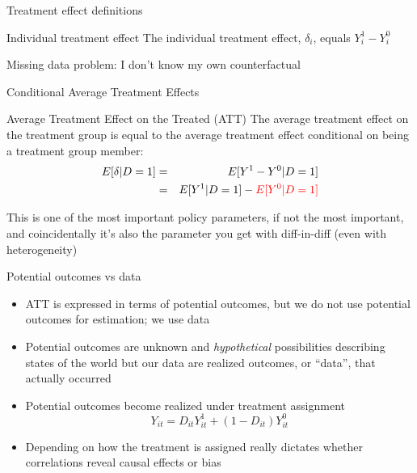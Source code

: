 \documentclass{beamer}
\begin{document}
\begin{frame}{Treatment effect definitions}


	\begin{block}{Individual treatment effect}
	    The individual treatment effect,  $\delta_i$, equals $Y_i^1-Y_i^0$
	\end{block}

Missing data problem:  I don't know my own counterfactual
	
\end{frame}


\begin{frame}{Conditional Average Treatment Effects}	
	\begin{block}{Average Treatment Effect on the Treated (ATT)}
	The average treatment effect on the treatment group is equal to the average treatment effect conditional on being a treatment group member:
		\begin{eqnarray*}
		E[\delta|D=1]&=&E[Y^1-Y^0|D=1] \nonumber \\
		&=&E[Y^1|D=1]-\textcolor{red}{E[Y^0|D=1]}
		\end{eqnarray*}
	\end{block}
	
	\bigskip

This is one of the most important policy parameters, if not the most important, and coincidentally it's also the parameter you get with diff-in-diff (even with heterogeneity)

	
\end{frame}

\begin{frame}{Potential outcomes vs data}

\begin{itemize}
\item ATT is expressed in terms of potential outcomes, but we do not use potential outcomes for estimation; we use data
\item Potential outcomes are unknown and \emph{hypothetical} possibilities describing states of the world but our data are realized outcomes, or ``data'', that actually occurred
\item Potential outcomes become realized under treatment assignment $$Y_{it}=D_{it}Y_{it}^1 + (1-D_{it})Y_{it}^0$$
\item Depending on how the treatment is assigned really dictates whether correlations reveal causal effects or bias

\end{itemize}
\end{frame}
\end{document}
